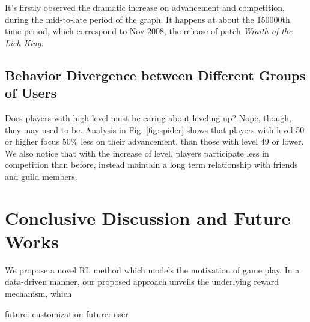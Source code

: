 \documentclass{sigchi}
\begin{document}
It's firstly observed the dramatic increase on advancement and competition, during the mid-to-late period of the graph.
It happens at about the 150000th time period, which correspond to Nov 2008, the release of patch \textit{Wraith of the Lich King}.


\subsection{Behavior Divergence between Different Groups of Users}

Does players with high level must be caring about leveling up?
Nope, though, they may used to be.
Analysis in Fig. \ref{fig:spider} shows that players with level 50 or higher focus 50\% less on their advancement, than those with level 49 or lower.
We also notice that with the increase of level, players participate less in competition than before, instead maintain a long term relationship with friends and guild members.

\section{Conclusive Discussion and Future Works}

We propose a novel RL method which models the motivation of game play.
In a data-driven manner, our proposed approach unveils the underlying reward mechanism, which

future: customization
future: user



\end{document}
